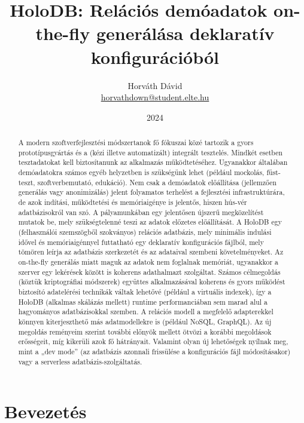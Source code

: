 \documentclass[
    parspace,
    noindent,
    nohyp,
]{elteiktdk}[2023/04/10]
\title{HoloDB: Relációs demóadatok on-the-fly generálása deklaratív konfigurációból}
\date{2024}
\author{Horváth Dávid \\ {\small\href{mailto:horvathdown@student.elte.hu}{horvathdown@student.elte.hu}} }
\affiliation{Mesteroktató}
\begin{document}

\listoftodos
\cleardoublepage

\maketitle

\begin{small}
\tableofcontents
\end{small}
\cleardoublepage


\begin{abstract}
A modern szoftverfejlesztési módszertanok fő fókuszai közé tartozik
a gyors prototípusgyártás és a (kézi illetve automatizált) integrált tesztelés.
Mindkét esetben tesztadatokat kell biztosítanunk az alkalmazás működtetéséhez.
Ugyanakkor általában demóadatokra számos egyéb helyzetben is szükségünk lehet
(például mockolás, füst-teszt, szoftverbemutató, edukáció).
Nem csak a demóadatok előállítása (jellemzően generálás vagy anonimizálás)
jelent folyamatos terhelést a fejlesztési infrastruktúrára,
de azok indítási, működtetési és memóriaigénye is jelentős, hiszen hús-vér adatbázisokról van szó.
A pályamunkában egy jelentősen újszerű megközelítést mutatok be,
mely szükségtelenné teszi az adatok előzetes előállítását.
A HoloDB egy (felhasználói szemszögből szokványos) relációs adatbázis,
mely minimális indulási idővel és memóriaigénnyel futtatható
egy deklaratív konfigurációs fájlból, mely tömören leírja az adatbázis szerkezetét
és az adataival szembeni követelményeket.
Az on-the-fly generálás miatt maguk az adatok nem foglalnak memóriát,
ugyanakkor a szerver egy lekérések között is koherens adathalmazt szolgáltat.
Számos célmegoldás (köztük kriptográfiai módszerek) együttes alkalmazásával
koherens és gyors működést biztosító adatelérési technikák váltak lehetővé (például a virtuális indexek),
így a HoloDB (alkalmas skálázás mellett) runtime performanciában
sem marad alul a hagyományos adatbázisokkal szemben.
A relációs modell a megfelelő adapterekkel könnyen kiterjeszthető más adatmodellekre is
(például NoSQL, GraphQL).
Az új megoldás reményeim szerint további előnyök mellett
ötvözi a korábbi megoldások erősségeit, míg kikerüli azok fő hátrányait.
Valamint olyan új lehetőségek nyílnak meg, mint a „dev mode”
(az adatbázis azonnali frissülése a konfigurációs fájl módosításakor)
vagy a serverless adatbázis-szolgáltatás.
\end{abstract}

\chapter{Bevezetés}
\end{document}
